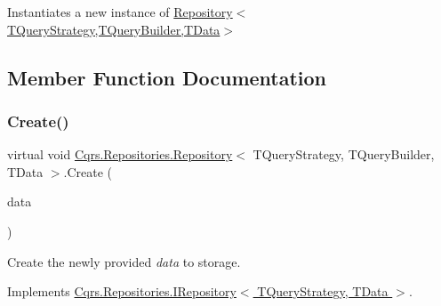 Instantiates a new instance of \hyperlink{classCqrs_1_1Repositories_1_1Repository_a2f4009847fa03a897c6698fd5a92d89f_a2f4009847fa03a897c6698fd5a92d89f}{Repository$<$\+T\+Query\+Strategy,\+T\+Query\+Builder,\+T\+Data$>$} 



\subsection{Member Function Documentation}
\mbox{\label{classCqrs_1_1Repositories_1_1Repository_a5d5d78262533aa2ab32eddbab83869bd_a5d5d78262533aa2ab32eddbab83869bd}} 
\subsubsection{\texorpdfstring{Create()}{Create()}\hspace{0.1cm}{\footnotesize\ttfamily [1/2]}}
{\footnotesize\ttfamily virtual void \hyperlink{classCqrs_1_1Repositories_1_1Repository}{Cqrs.\+Repositories.\+Repository}$<$ T\+Query\+Strategy, T\+Query\+Builder, T\+Data $>$.Create (\begin{DoxyParamCaption}\item[{T\+Data}]{data }\end{DoxyParamCaption})\hspace{0.3cm}{\ttfamily [virtual]}}



Create the newly provided {\itshape data}  to storage. 



Implements \hyperlink{interfaceCqrs_1_1Repositories_1_1IRepository_a240c8d094207a22b0c805a5c830d8615_a240c8d094207a22b0c805a5c830d8615}{Cqrs.\+Repositories.\+I\+Repository$<$ T\+Query\+Strategy, T\+Data $>$}.

\mbox{\label{classCqrs_1_1Repositories_1_1Repository_a2af8103cc2946317f8ee9ede643bbc68_a2af8103cc2946317f8ee9ede643bbc68}} 
